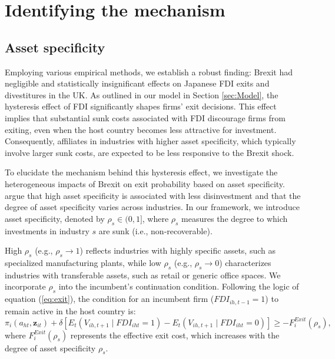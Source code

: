 \documentclass[preprint,11pt,authoryear]{elsarticle}
\begin{document}
\section{Identifying the mechanism \label{sec:mechanism}}
\subsection{Asset specificity}\label{sec:assetchannel}

Employing various empirical methods, we establish a robust finding: Brexit had negligible and statistically insignificant effects on Japanese FDI exits and divestitures in the UK. As outlined in our model in Section \ref{sec:Model}, the hysteresis effect of FDI significantly shapes firms' exit decisions. This effect implies that substantial sunk costs associated with FDI discourage firms from exiting, even when the host country becomes less attractive for investment. Consequently, affiliates in industries with higher asset specificity, which typically involve larger sunk costs, are expected to be less responsive to the Brexit shock.

To elucidate the mechanism behind this hysteresis effect, we investigate the heterogeneous impacts of Brexit on exit probability based on asset specificity. \cite{kermani2023asset} argue that high asset specificity is associated with less disinvestment and that the degree of asset specificity varies across industries. In our framework, we introduce asset specificity, denoted by $\rho_s \in (0, 1]$, where $\rho_s$ measures the degree to which investments in industry $s$ are sunk (i.e., non-recoverable). 

High $\rho_s$ (e.g., $\rho_s \to 1$) reflects industries with highly specific assets, such as specialized manufacturing plants, while low $\rho_s$ (e.g., $\rho_s \to 0$) characterizes industries with transferable assets, such as retail or generic office spaces. We incorporate $\rho_s$ into the incumbent's continuation condition. Following the logic of equation (\ref{eq:exit}), the condition for an incumbent firm ($FDI_{ih,t-1}=1$) to remain active in the host country is:
\begin{equation}
\pi_i(a_{ht}, \mathbf{z}_{it}) + \delta \left[ E_t \left( V_{ih,t+1} \mid FDI_{iht} = 1 \right) - E_t \left( V_{ih,t+1} \mid FDI_{iht} = 0 \right) \right] \geq -F_i^{Exit}(\rho_s),
\end{equation}
where $F_i^{Exit}(\rho_s)$ represents the effective exit cost, which increases with the degree of asset specificity $\rho_s$. 
\end{document}
